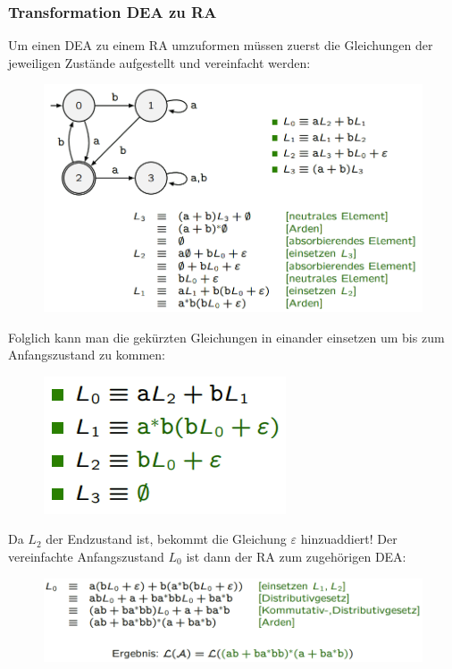\documentclass[12pt,a4paper]{article}
\begin{document}
\subsubsection{Transformation DEA zu RA}
Um einen DEA zu einem RA umzuformen müssen zuerst die Gleichungen der jeweiligen Zustände aufgestellt und vereinfacht werden:\newline
\begin{center}
	\begin{figure}[!h]
		\includegraphics[width=\textwidth]{Bilder/DEAzuRA1.png}
	\end{figure}
\end{center}
Folglich kann man die gekürzten Gleichungen in einander einsetzen um bis zum Anfangszustand zu kommen:\newline
\begin{center}
	\begin{figure}[!h]
		\includegraphics[]{Bilder/DEAzuRA2.png}
	\end{figure}
\end{center}
Da $L_2$ der Endzustand ist, bekommt die Gleichung $\varepsilon$ hinzuaddiert!\newline
Der vereinfachte Anfangszustand $L_0$ ist dann der RA zum zugehörigen DEA:\newline
\begin{center}
	\begin{figure}[!h]
		\includegraphics[width=\textwidth]{Bilder/DEAzuRA3.png}
	\end{figure}
\end{center}
\end{document}

